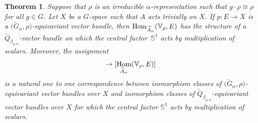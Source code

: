 \documentclass[pdftex]{sigma}
\def\S{\mathbb{S}}
\def\V{\mathbb{V}}
\DeclareMathOperator{\Hom}{\textup{Hom}}
\newtheorem{Th}{Theorem}[section]
\theoremstyle{definition}
\numberwithin{equation}{section}
\begin{document}
\begin{Th}\label{teo,bij}
Suppose that $\rho$ is an irreducible $\alpha$-representation such that $g\cdot\rho\cong\rho$
for all $g \in G$. Let $X$ be a $G$-space such that $A$ acts trivially on $X$.
If $p\colon E\rightarrow X$ is a $\big(\widetilde{G}_{\alpha}, \rho\big)$-equivariant vector bundle, then
$\Hom_{\widetilde{A}_{\alpha}}(\V_{\rho},E)$ has the
structure of a $\widetilde{Q}_{\beta_{\rho,\alpha}}$-vector bundle on which
the central factor~$\S^{1}$ acts by multiplication of
scalars. Moreover, the assignment
\begin{gather*}
[E]\rightarrow
[\Hom_{\widetilde{A}_{\alpha}}(\V_{\rho},E)]
\end{gather*}
is a natural one to one correspondence between isomorphism
classes of $\big(\widetilde{G}_{\alpha},\rho\big)$-equivariant
vector bundles over $X$ and isomorphism classes of
$\widetilde{Q}_{\beta_{\rho,\alpha}}$-equivariant vector bundles over $X$
for which the central factor $\S^{1}$ acts by multiplication of scalars.
\end{Th}
\end{document}

